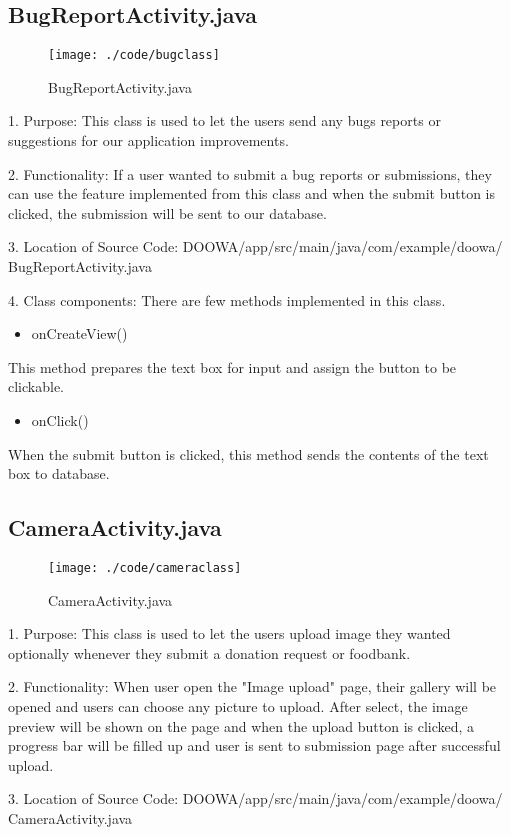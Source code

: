 \documentclass[conference]{IEEEtran}
\begin{document}
\subsection{BugReportActivity.java}
\begin{figure}[h!]
\texttt{[image: ./code/bugclass]}
\centering
\caption{BugReportActivity.java}
\end{figure}
1. Purpose: This class is used to let the users send any bugs reports or suggestions for our application improvements.\break
\par 2. Functionality: If a user wanted to submit a bug reports or submissions, they can use the feature implemented from this class and when the submit button is clicked, the submission will be sent to our database.\break

3. Location of Source Code: DOOWA/app/src/main/java/com/example/doowa/ BugReportActivity.java\break

4. Class components: There are few methods implemented in this class.
\begin{itemize}
\item onCreateView()
\end{itemize}
This method prepares the text box for input and assign the button to be clickable.
\begin{itemize}
\item onClick()
\end{itemize}
When the submit button is clicked, this method sends the contents of the text box to database.
\newpage
\subsection{CameraActivity.java}
\begin{figure}[h!]
\texttt{[image: ./code/cameraclass]}
\centering
\caption{CameraActivity.java}
\end{figure}
1. Purpose: This class is used to let the users upload image they wanted optionally whenever they submit a donation request or foodbank.\break
\par 2. Functionality: When user open the "Image upload" page, their gallery will be opened and users can choose any picture to upload. After select, the image preview will be shown on the page and when the upload button is clicked, a progress bar will be filled up and user is sent to submission page after successful upload. \break

3. Location of Source Code: DOOWA/app/src/main/java/com/example/doowa/ CameraActivity.java\break
\end{document}

